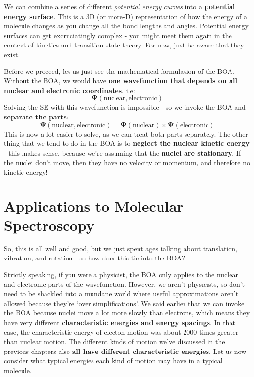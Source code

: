 \documentclass{memoir}[11pt,oneside,a4paper,openany]
\newcommand{\wf}{\ensuremath{\bm{\Psi}}\xspace}
\begin{document}
We can combine a series of different \emph{potential energy curves} into a \textbf{potential energy surface}. This is a 3D (or more-D) representation of how the energy of a molecule changes as you change all the bond lengths and angles. Potential energy surfaces can get excruciatingly complex - you might meet them again in the context of kinetics and transition state theory. For now, just be aware that they exist.

Before we proceed, let us just see the mathematical formulation of the BOA. Without the BOA, we would have \textbf{one wavefunction that depends on all nuclear and electronic coordinates}, i.e:
\begin{equation}
	\wf(\text{nuclear},\text{electronic})
\end{equation}
Solving the SE with this wavefunction is impossible - so we invoke the BOA and \textbf{separate the parts}:
\begin{equation}
	\wf(\text{nuclear},\text{electronic}) = \wf(\text{nuclear}) \times \wf(\text{electronic})
\end{equation}
This is now a lot easier to solve, as we can treat both parts separately. The other thing that we tend to do in the BOA is to \textbf{neglect the nuclear kinetic energy} - this makes sense, because we're assuming that the \textbf{nuclei are stationary}. If the nuclei don't move, then they have no velocity or momentum, and therefore no kinetic energy!

\section{Applications to Molecular Spectroscopy}
So, this is all well and good, but we just spent ages talking about translation, vibration, and rotation - so how does this tie into the BOA?

Strictly speaking, if you were a physicist, the BOA only applies to the nuclear and electronic parts of the wavefunction. However, we aren't physicists, so don't need to be shackled into a mundane world where useful approximations aren't allowed because they're `over simplifications'. We said earlier that we can invoke the BOA because nuclei move a lot more slowly than electrons, which means they have very different \textbf{characteristic energies and energy spacings}. In that case, the characteristic energy of electon motion was about 2000 times greater than nuclear motion. The different kinds of motion we've discussed in the previous chapters also \textbf{all have different characteristic energies}. Let us now consider what typical energies each kind of motion may have in a typical molecule. 
\end{document}

